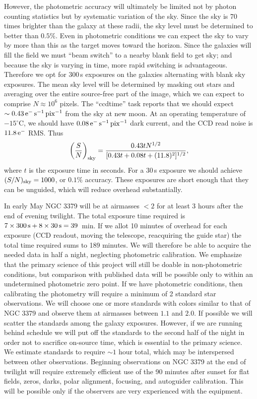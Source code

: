 However, the photometric accuracy will ultimately be limited not by
photon counting statistics but by systematic variation of the sky.
Since the sky is 70 times brighter than the galaxy at these radii, the
sky level must be determined to better than $0.5\%$. Even in photometric
conditions we can expect the sky to vary by more than this as the target
moves toward the horizon. Since the galaxies will fill the field we must
``beam switch'' to a nearby blank field to get sky; and because the sky
is varying in time, more rapid switching is advantageous. Therefore we
opt for $300\,$s exposures on the galaxies alternating with blank sky
exposures. The mean sky level will be determined by masking out stars
and averaging over the entire source-free part of the image, which we can
expect to comprise $N\approx 10^6$ pixels. The ``ccdtime'' task reports
that we should expect $\sim 0.43\,{\rm e}^-\,{\rm s}^{-1}\,{\rm pix}^{-1}$
from the sky at new moon. At an operating temperature of $-15^\circ$C, we
should have $0.08\,{\rm e}^-\,{\rm s}^{-1}\,{\rm pix}^{-1}$ dark current,
and the CCD read noise is $11.8\,{\rm e}^-$ RMS. Thus
\begin{equation}
\left({S\over N}\right)_{\rm sky}
	= {0.43 t N^{1/2} \over [0.43 t + 0.08 t + (11.8)^2]^{1/2}},
\end{equation}
where $t$ is the exposure time in seconds. For a $30\,$s exposure we
should achieve $(S/N)_{\rm sky}=1000$, or $0.1\%$ accuracy. These
exposures are short enough that they can be unguided, which will reduce
overhead substantially.

In early May NGC 3379 will be at airmasses $<2$ for at least 3 hours
after the end of evening twilight. The total exposure time required is
$7 \times 300\,{\rm s} + 8\times 30\,{\rm s} = 39\,$ min. If we allot
10 minutes of overhead for each exposure (CCD readout, moving the
telescope, reacquiring the guide star) the total time required sums to
189 minutes. We will therefore be able to acquire the needed data
in half a night, neglecting photometric calibration. We emphasize that
the primary science of this project will still be doable in non-photometric
conditions, but comparison with published data will be possible only to
within an undetermined photometric zero point. If we have photometric
conditions, then calibrating the photometry will require a minimum of
2 standard star observations. We will choose one or more standards with
colors similar to that of NGC 3379 and observe them at airmasses between
$1.1$ and $2.0$. If possible we will scatter the standards among the
galaxy exposures. However, if we are running behind schedule we will put
off the standards to the second half of the night in order not to
sacrifice on-source time, which is essential to the primary science.
We estimate standards to require $\sim 1$ hour total, which may be
interspersed between other observations. Beginning observations on NGC
3379 at the end of twilight will require extremely efficient use of the
90 minutes after sunset for flat fields, zeros, darks, polar alignment,
focusing, and autoguider calibration. This will be possible only if the
observers are very experienced with the equipment.


